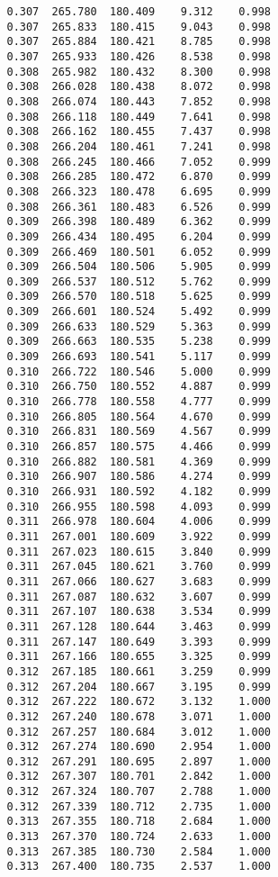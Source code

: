 \begin{verbatim}
   0.307  265.780  180.409    9.312    0.998
   0.307  265.833  180.415    9.043    0.998
   0.307  265.884  180.421    8.785    0.998
   0.307  265.933  180.426    8.538    0.998
   0.308  265.982  180.432    8.300    0.998
   0.308  266.028  180.438    8.072    0.998
   0.308  266.074  180.443    7.852    0.998
   0.308  266.118  180.449    7.641    0.998
   0.308  266.162  180.455    7.437    0.998
   0.308  266.204  180.461    7.241    0.998
   0.308  266.245  180.466    7.052    0.999
   0.308  266.285  180.472    6.870    0.999
   0.308  266.323  180.478    6.695    0.999
   0.308  266.361  180.483    6.526    0.999
   0.309  266.398  180.489    6.362    0.999
   0.309  266.434  180.495    6.204    0.999
   0.309  266.469  180.501    6.052    0.999
   0.309  266.504  180.506    5.905    0.999
   0.309  266.537  180.512    5.762    0.999
   0.309  266.570  180.518    5.625    0.999
   0.309  266.601  180.524    5.492    0.999
   0.309  266.633  180.529    5.363    0.999
   0.309  266.663  180.535    5.238    0.999
   0.309  266.693  180.541    5.117    0.999
   0.310  266.722  180.546    5.000    0.999
   0.310  266.750  180.552    4.887    0.999
   0.310  266.778  180.558    4.777    0.999
   0.310  266.805  180.564    4.670    0.999
   0.310  266.831  180.569    4.567    0.999
   0.310  266.857  180.575    4.466    0.999
   0.310  266.882  180.581    4.369    0.999
   0.310  266.907  180.586    4.274    0.999
   0.310  266.931  180.592    4.182    0.999
   0.310  266.955  180.598    4.093    0.999
   0.311  266.978  180.604    4.006    0.999
   0.311  267.001  180.609    3.922    0.999
   0.311  267.023  180.615    3.840    0.999
   0.311  267.045  180.621    3.760    0.999
   0.311  267.066  180.627    3.683    0.999
   0.311  267.087  180.632    3.607    0.999
   0.311  267.107  180.638    3.534    0.999
   0.311  267.128  180.644    3.463    0.999
   0.311  267.147  180.649    3.393    0.999
   0.311  267.166  180.655    3.325    0.999
   0.312  267.185  180.661    3.259    0.999
   0.312  267.204  180.667    3.195    0.999
   0.312  267.222  180.672    3.132    1.000
   0.312  267.240  180.678    3.071    1.000
   0.312  267.257  180.684    3.012    1.000
   0.312  267.274  180.690    2.954    1.000
   0.312  267.291  180.695    2.897    1.000
   0.312  267.307  180.701    2.842    1.000
   0.312  267.324  180.707    2.788    1.000
   0.312  267.339  180.712    2.735    1.000
   0.313  267.355  180.718    2.684    1.000
   0.313  267.370  180.724    2.633    1.000
   0.313  267.385  180.730    2.584    1.000
   0.313  267.400  180.735    2.537    1.000

\end{verbatim}
